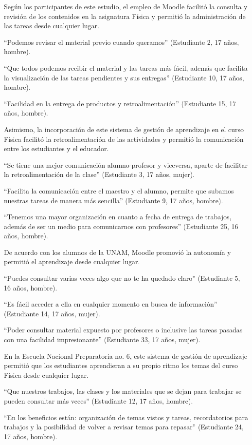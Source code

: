 \documentclass[spanish]{textolivre}
\begin{document}
Según los participantes de este estudio, el empleo de Moodle facilitó la consulta y revisión de los contenidos en la asignatura Física y permitió la administración de las tareas desde cualquier lugar.

“Podemos revisar el material previo cuando queramos” (Estudiante 2, 17 años, hombre).

“Que todos podemos recibir el material y las tareas más fácil, además que facilita la visualización de las tareas pendientes y sus entregas” (Estudiante 10, 17 años, hombre).

“Facilidad en la entrega de productos y retroalimentación” (Estudiante 15, 17 años, hombre).

Asimismo, la incorporación de este sistema de gestión de aprendizaje en el curso Física facilitó la retroalimentación de las actividades y permitió la comunicación entre los estudiantes y el educador.

“Se tiene una mejor comunicación alumno-profesor y viceversa, aparte de facilitar la retroalimentación de la clase” (Estudiante 3, 17 años, mujer).

“Facilita la comunicación entre el maestro y el alumno, permite que subamos nuestras tareas de manera más sencilla” (Estudiante 9, 17 años, hombre).

“Tenemos una mayor organización en cuanto a fecha de entrega de trabajos, además de ser un medio para comunicarnos con profesores” (Estudiante 25, 16 años, hombre).

De acuerdo con los alumnos de la UNAM, Moodle promovió la autonomía y permitió el aprendizaje desde cualquier lugar.

“Puedes consultar varias veces algo que no te ha quedado claro” (Estudiante 5, 16 años, hombre).

“Es fácil acceder a ella en cualquier momento en busca de información” (Estudiante 14, 17 años, mujer).

“Poder consultar material expuesto por profesores o inclusive las tareas pasadas con una facilidad impresionante” (Estudiante 33, 17 años, mujer).

En la Escuela Nacional Preparatoria no. 6, este sistema de gestión de aprendizaje permitió que los estudiantes aprendieran a su propio ritmo los temas del curso Física desde cualquier lugar.

“Que nuestros trabajos, las clases y los materiales que se dejan para trabajar se pueden consultar más veces” (Estudiante 12, 17 años, hombre).

 “En los beneficios están: organización de temas vistos y tareas, recordatorios para trabajos y la posibilidad de volver a revisar temas para repasar” (Estudiante 24, 17 años, hombre).
 
\end{document}

